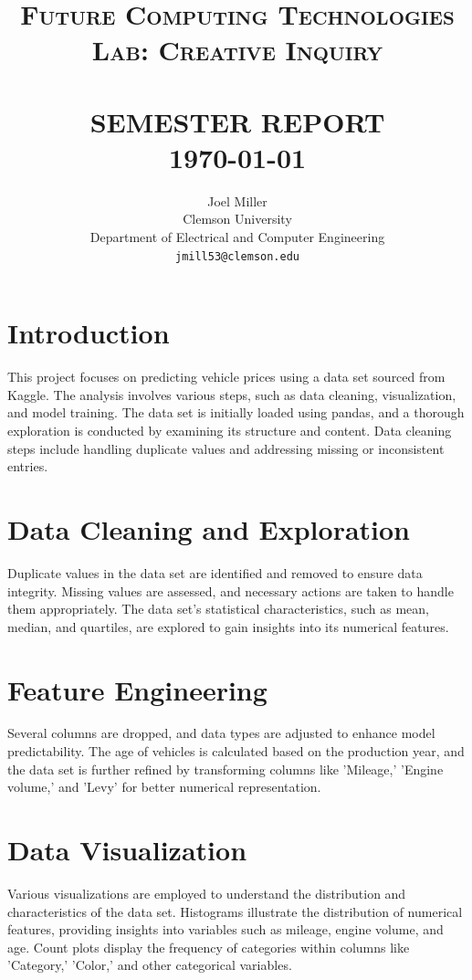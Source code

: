 \documentclass[paper=a4, fontsize=11pt,twoside]{scrartcl}
\title{
    \normalsize \textsc{Future Computing Technologies Lab: Creative Inquiry} \\ [2.0cm]
	\HRule{0.5pt} \\
	\LARGE \textbf{\uppercase{Semester Report}}
	\HRule{2pt} \\ [0.5cm]
	\normalsize \today
}
\author{
	Joel Miller\\	
	Clemson University\\	
	Department of Electrical and Computer Engineering\\
	\texttt{jmill53@clemson.edu} \\
}
\makeatletter
\def\printtitle{
	{\centering \@title\par}}
\def\printauthor{
	{\centering \large \@author}}
\makeatother
\begin{document}
\thispagestyle{empty}

\printtitle
\vfill
\printauthor
\newpage

\setcounter{page}{1}

\section{Introduction}

This project focuses on predicting vehicle prices using a data set sourced from Kaggle. The analysis involves various steps, such as data cleaning, visualization, and model training. The data set is initially loaded using pandas, and a thorough exploration is conducted by examining its structure and content. Data cleaning steps include handling duplicate values and addressing missing or inconsistent entries.

\section{Data Cleaning and Exploration}

Duplicate values in the data set are identified and removed to ensure data integrity. Missing values are assessed, and necessary actions are taken to handle them appropriately. The data set's statistical characteristics, such as mean, median, and quartiles, are explored to gain insights into its numerical features.

\section{Feature Engineering}

Several columns are dropped, and data types are adjusted to enhance model predictability. The age of vehicles is calculated based on the production year, and the data set is further refined by transforming columns like 'Mileage,' 'Engine volume,' and 'Levy' for better numerical representation.

\section{Data Visualization}

Various visualizations are employed to understand the distribution and characteristics of the data set. Histograms illustrate the distribution of numerical features, providing insights into variables such as mileage, engine volume, and age. Count plots display the frequency of categories within columns like 'Category,' 'Color,' and other categorical variables.
\end{document}
